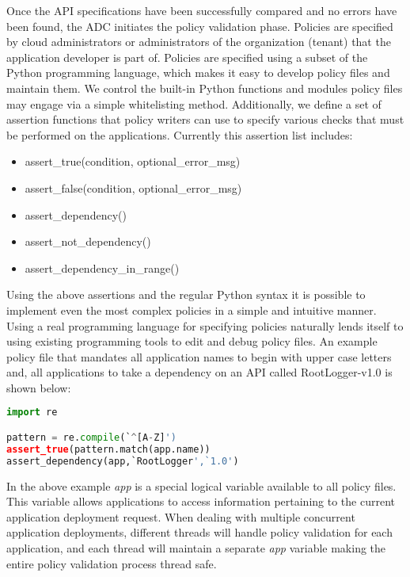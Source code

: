 Once the API specifications have been successfully compared and no errors have been found, the ADC initiates the policy validation phase. Policies
are specified by cloud administrators or administrators of the organization (tenant) that the application developer is part of. Policies are specified using
a subset of the Python programming language, which makes it easy to develop policy files and maintain them. We control the built-in Python functions and
modules policy files may engage via a simple whitelisting method. Additionally, we define a set of assertion functions that policy writers can use to specify
various checks that must be performed on the applications. Currently this assertion list includes:

\begin{itemize}
\item assert\_true(condition, optional\_error\_msg)
\item assert\_false(condition, optional\_error\_msg)
\item assert\_dependency()
\item assert\_not\_dependency()
\item assert\_dependency\_in\_range()
\end{itemize}

Using the above assertions and the regular Python syntax it is possible to implement even the most complex policies in a simple and intuitive manner.
Using a real programming language for specifying policies naturally lends itself to using existing programming tools to edit and debug policy files. An example
policy file that mandates all application names to begin with upper case letters and, all applications to take a dependency on an API called RootLogger-v1.0
is shown below:

\begin{lstlisting}[language=Python, frame=single]
import re

pattern = re.compile(`^[A-Z]')
assert_true(pattern.match(app.name))
assert_dependency(app,`RootLogger',`1.0')
\end{lstlisting}

In the above example \textit{app} is a special logical variable available to all policy files. This variable allows applications to access information pertaining
to the current application deployment request. When dealing with multiple concurrent application deployments, different threads will handle policy validation
for each application, and each thread will maintain a separate \textit{app} variable making the entire policy validation process thread safe.

